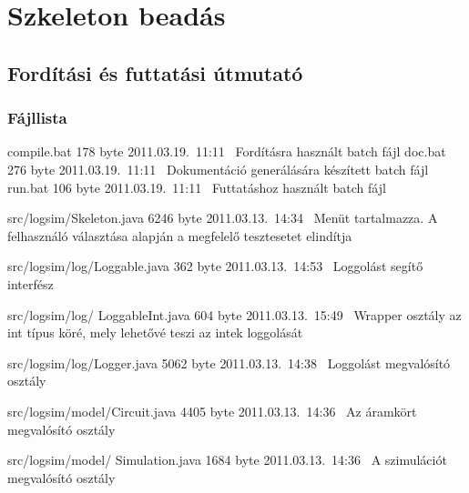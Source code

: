 %
\chapter{Szkeleton beadás}

\thispagestyle{fancy}

\section{Fordítási és futtatási útmutató}

\subsection{Fájllista}

\begin{fajllista}

\fajl
{compile.bat} %
{178 byte} %
{2011.03.19.~11:11~} %
{Fordításra használt batch fájl} %
\fajl
{doc.bat} %
{276 byte} %
{2011.03.19.~11:11~} %
{Dokumentáció generálására készített batch fájl} %
\fajl
{run.bat} %
{106 byte} %
{2011.03.19.~11:11~} %
{Futtatáshoz használt batch fájl} %

\fajl
{src/logsim/Skeleton.java} %
{6246 byte} %
{2011.03.13.~14:34~} %
{Menüt tartalmazza. A felhasználó választása alapján a megfelelő tesztesetet elindítja} %

\fajl
{src/logsim/log/Loggable.java} %
{362 byte} %
{2011.03.13.~14:53~} %
{Loggolást segítő interfész} %

\fajl
{src/logsim/log/\newline
LoggableInt.java} %
{604 byte} %
{2011.03.13.~15:49~} %
{Wrapper osztály az int típus köré, mely lehetővé teszi az intek loggolását} %

\fajl
{src/logsim/log/Logger.java} %
{5062 byte} %
{2011.03.13.~14:38~} %
{Loggolást megvalósító osztály} %

\fajl
{src/logsim/model/Circuit.java} %
{4405 byte} %
{2011.03.13.~14:36~} %
{Az áramkört megvalósító osztály} %

\fajl
{src/logsim/model/\newline
Simulation.java} %
{1684 byte} %
{2011.03.13.~14:36~} %
{A szimulációt megvalósító osztály} %


\end{fajllista}

